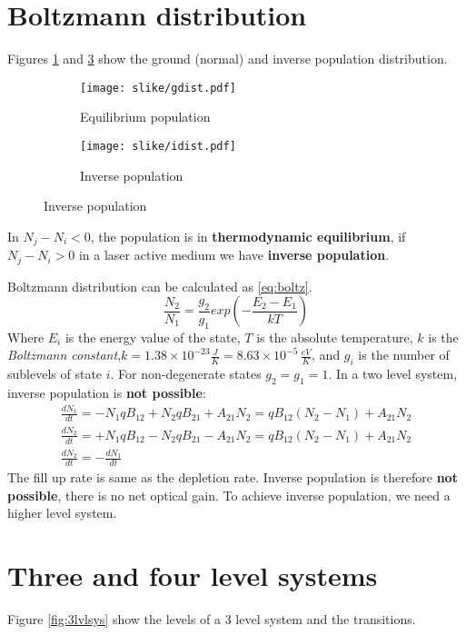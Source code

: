 \section{Boltzmann distribution}
Figures \ref{fig:gdist} and \ref{fig:idist} show the ground (normal) and inverse population distribution.
\begin{figure}[h!]
    \centering
    \begin{subfigure}{0.4\textwidth}
        \texttt{[image: slike/gdist.pdf]}
        \caption{Equilibrium population}
        \label{fig:gdist}
    \end{subfigure}
    \begin{subfigure}{0.4\textwidth}
        \texttt{[image: slike/idist.pdf]}
        \caption{Inverse population}
        \label{fig:idist}
    \end{subfigure}
\end{figure}
 In $N_j - N_i < 0$, the population is in \textbf{thermodynamic equilibrium}, if $N_j - N_i > 0 $ in a laser
active medium we have \textbf{inverse population}.

Boltzmann distribution can be calculated as \ref{eq:boltz}.
\begin{equation}
    \frac{N_2}{N_1} = \frac{g_2}{g_1} exp(-\frac{E_2 - E_1}{kT})
    \label{eq:boltz}
\end{equation}
Where $E_i$ is the energy value of the state, $T$ is the absolute temperature,
$k$ is the \textit{Boltzmann constant},$k = 1.38 \times 10^{-23} \frac{J}{K} = 8.63 \times 10^{-5}\, \frac{eV}{K}$, and $g_i$ is the number of sublevels of state $i$.
For non-degenerate states $g_2 = g_1 = 1$.
In a two level system, inverse population is \textbf{not possible}:
\begin{gather}
    \frac{dN_1}{dt} = -N_1 q B_{12} + N_2 q B_{21} + A_{21} N_2 = q B_{12} (N_2 - N_1) + A_{21}N_2 \\
    \frac{dN_2}{dt} = +N_1 q B_{12} - N_2 q B_{21} - A_{21} N_2 = q B_{12} (N_2 - N_1) + A_{21}N_2 \\
    \frac{dN_2}{dt} = -\frac{dN_1}{dt}
\end{gather}
The fill up rate  is same as the depletion rate.
Inverse population is therefore \textbf{not possible}, there is no net optical gain.
To achieve inverse population, we need a higher level system.

\section{Three and four level systems}
Figure \ref{fig:3lvlsys} show the levels of a 3 level system and the transitions.

